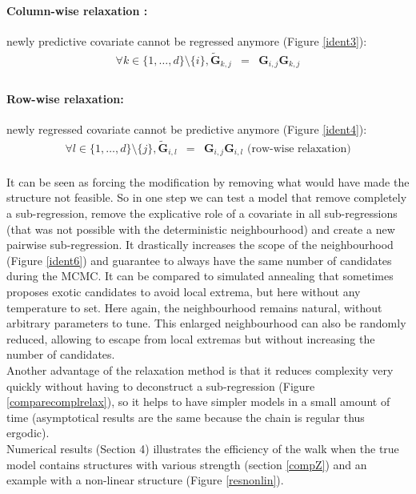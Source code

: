 \documentclass[12pt,a4paper]{report}
\begin{document}
\paragraph{Column-wise relaxation :}		
newly predictive covariate cannot be regressed anymore (Figure \ref{ident3}):
		\begin{eqnarray}
		\forall k \in \{1,\dots,d\}\setminus \{i\}, \tilde{\boldsymbol{G}}_{k,j}&=&\boldsymbol{G}_{i,j}\boldsymbol{G}_{k,j}  \nonumber  \\
				\end{eqnarray}
\paragraph{Row-wise relaxation:} newly regressed covariate cannot be predictive anymore (Figure \ref{ident4}):
		\begin{eqnarray}
		\forall l \in \{1,\dots,d\}\setminus \{j\}, \tilde{\boldsymbol{G}}_{i,l}&=&\boldsymbol{G}_{i,j}\boldsymbol{G}_{i,l} \textrm{ (row-wise relaxation)} \nonumber 
	\end{eqnarray} \\
	
	It can be seen as forcing the modification by removing what would have made the structure not feasible. So in one step we can test a model that remove completely a sub-regression, remove the explicative role of a covariate in all sub-regressions (that was not possible with the deterministic neighbourhood) and create a new pairwise sub-regression. It drastically increases the scope of the neighbourhood (Figure \ref{ident6}) and guarantee to always have the same number of candidates during the MCMC. It can be compared to simulated annealing that sometimes proposes exotic candidates to avoid local extrema, but here without any temperature to set. Here again, the neighbourhood remains natural, without arbitrary parameters to tune. This enlarged neighbourhood can also be randomly reduced, allowing to escape from local extremas but without increasing the number of candidates. \\
	
	Another advantage of the relaxation method is that it reduces complexity very quickly without having to deconstruct a sub-regression (Figure \ref{comparecomplrelax}), so it helps to have simpler models in a small amount of time (asymptotical results are the same because the chain is regular thus ergodic).\\
			
Numerical results (Section 4) illustrates the efficiency of the walk when the true model contains structures with various strength (section \ref{compZ}) and an example with a non-linear structure (Figure \ref{resnonlin}). \\
\end{document}
